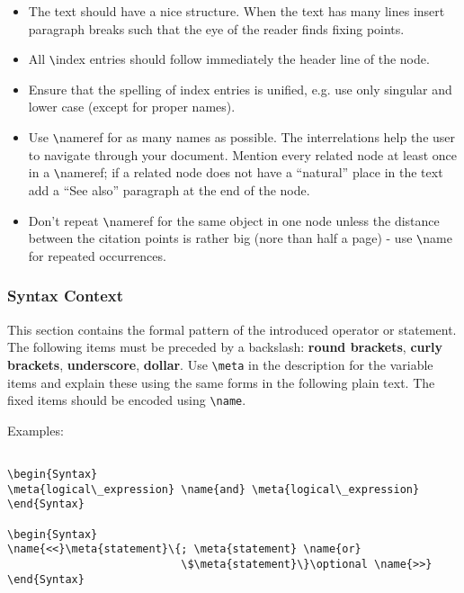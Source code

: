 \begin{itemize}
\item  The text should have a nice structure. When the text has many lines
insert paragraph breaks such that the eye of the reader finds fixing points.

\item  All \verb|\|index entries should follow immediately the header line
of the node.

\item  Ensure that the spelling of index entries is unified, e.g. use only
singular and lower case (except for proper names).

\item  Use \verb|\|nameref for as many names as possible. The
interrelations help the user to navigate through your document. Mention
every related node at least once in a \verb|\|nameref; if a related node
does not have a ``natural'' place in the text add a ``See also'' paragraph
at the end of the node.

\item  Don't repeat \verb|\|nameref for the same object in one node unless
the distance between the citation points is rather big (nore than half a
page) - use \verb|\|name for repeated occurrences.
\end{itemize}

\subsubsection{Syntax Context}

This section contains the formal pattern of the introduced operator or
statement. The following items must be preceded by a backslash: {\bf round
brackets}, {\bf curly brackets}, {\bf underscore}, {\bf dollar}. Use 
\verb|\meta| in the description for the variable items and explain these
using the same forms in the following plain text. The fixed items should be
encoded using \verb|\name|.

Examples: 
\begin{verbatim}

\begin{Syntax}
\meta{logical\_expression} \name{and} \meta{logical\_expression}
\end{Syntax}

\begin{Syntax}
\name{<<}\meta{statement}\{; \meta{statement} \name{or}
                           \$\meta{statement}\}\optional \name{>>}
\end{Syntax}
\end{verbatim}


